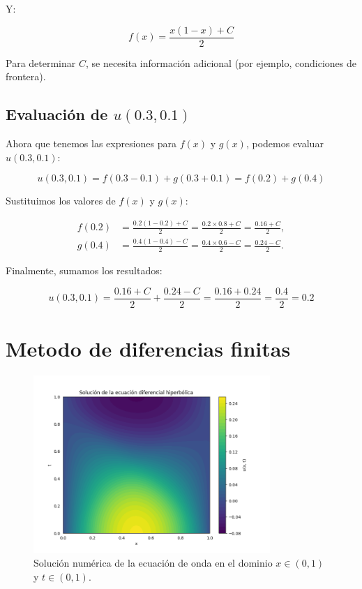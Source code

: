 Y:

\begin{equation}
f(x) = \frac{x(1 - x) + C}{2}
\end{equation}

Para determinar \( C \), se necesita información adicional (por ejemplo, condiciones de frontera).

\subsection{Evaluación de \( u(0.3, 0.1) \)}

Ahora que tenemos las expresiones para \( f(x) \) y \( g(x) \), podemos evaluar \( u(0.3, 0.1) \):

\begin{equation}
u(0.3, 0.1) = f(0.3 - 0.1) + g(0.3 + 0.1) = f(0.2) + g(0.4)
\end{equation}

Sustituimos los valores de \( f(x) \) y \( g(x) \):

\begin{align}
f(0.2) &= \frac{0.2(1 - 0.2) + C}{2} = \frac{0.2 \times 0.8 + C}{2} = \frac{0.16 + C}{2}, \\
g(0.4) &= \frac{0.4(1 - 0.4) - C}{2} = \frac{0.4 \times 0.6 - C}{2} = \frac{0.24 - C}{2}.
\end{align}

Finalmente, sumamos los resultados:

\begin{equation}
u(0.3, 0.1) = \frac{0.16 + C}{2} + \frac{0.24 - C}{2} = \frac{0.16 + 0.24}{2} = \frac{0.4}{2} = 0.2
\end{equation}

\newpage
\section{Metodo de diferencias finitas}

\begin{figure}[h!]
    \centering
    \includegraphics[width=0.8\textwidth]{figuras/ecuacion_ondas.png}
    \caption{Solución numérica de la ecuación de onda en el dominio \(x \in (0, 1)\) y \(t \in (0, 1)\).}
    \label{fig:solucion_numerica}
\end{figure}


